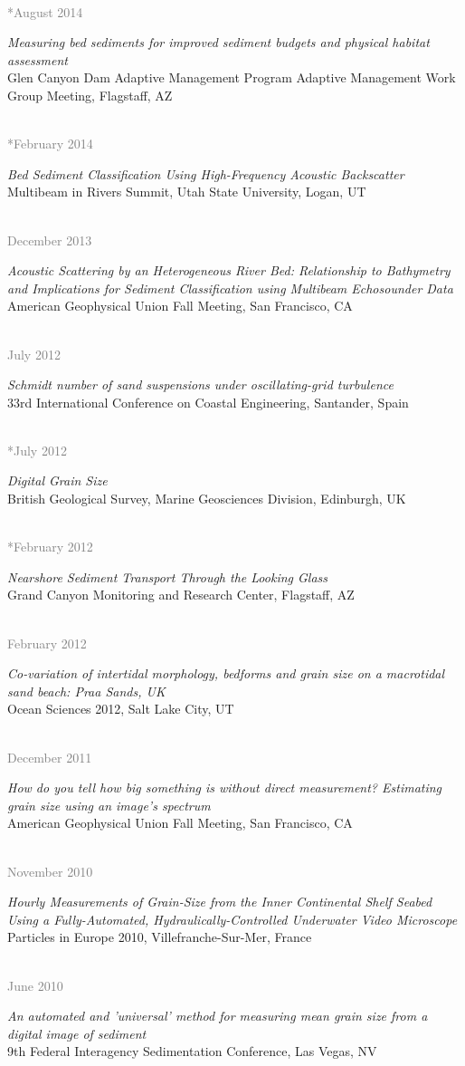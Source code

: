 \documentclass{article} %
\newlength\sidebarwidth
\newcommand{\dateonly}[2][]
	 {\begin{minipage}{\textwidth}
	 \vspace*{.4\baselineskip}
         \nopagebreak\hspace{0in}%
         \nopagebreak\begin{minipage}[t]{\sidebarwidth - .2cm}
         \raggedleft {~}
         {\\[-\baselineskip] \textcolor{gray}{\footnotesize #1}}
	 \end{minipage}%
	 \hfill
	 \begin{minipage}[t]{\linewidth - \sidebarwidth}
	 #2%
	 \end{minipage}%
	 \vspace*{.2\baselineskip plus 1\baselineskip minus
	 .2\baselineskip}%
	 \end{minipage}}
\begin{document}
  \dateonly[**August 2014]{
      {\it Measuring bed sediments for improved sediment budgets and physical habitat assessment}\\
      Glen Canyon Dam Adaptive Management Program Adaptive Management Work Group Meeting, Flagstaff, AZ
  }

  \dateonly[**February 2014]{
      {\it Bed Sediment Classification Using High-Frequency Acoustic Backscatter}\\
      Multibeam in Rivers Summit, Utah State University, Logan, UT
  }

  \dateonly[December 2013]{
      {\it Acoustic Scattering by an Heterogeneous River Bed: Relationship to Bathymetry and Implications for Sediment Classification using Multibeam Echosounder Data}\\
      American Geophysical Union Fall Meeting, San Francisco, CA
  }

  \dateonly[July 2012]{
      {\it Schmidt number of sand suspensions under oscillating-grid turbulence}\\
      33rd International Conference on Coastal Engineering, Santander, Spain
  }

  \dateonly[**July 2012]{
      {\it Digital Grain Size}\\
      British Geological Survey, Marine Geosciences Division, Edinburgh, UK
  }

  \dateonly[**February 2012]{
      {\it Nearshore Sediment Transport Through the Looking Glass}\\
      Grand Canyon Monitoring and Research Center, Flagstaff, AZ
  }

  \dateonly[February 2012]{
      {\it Co-variation of intertidal morphology, bedforms and grain size on a macrotidal sand beach: Praa Sands, UK}\\
      Ocean Sciences 2012, Salt Lake City, UT
  }

  \dateonly[December 2011]{
      {\it How do you tell how big something is without direct measurement? Estimating grain size using an image's spectrum}\\
      American Geophysical Union Fall Meeting, San Francisco, CA
  }

  \dateonly[November 2010]{
      {\it Hourly Measurements of Grain-Size from the Inner Continental Shelf Seabed Using a Fully-Automated, Hydraulically-Controlled Underwater Video Microscope}\\
      Particles in Europe 2010, Villefranche-Sur-Mer, France
  }

  \dateonly[June 2010]{
      {\it An automated and 'universal' method for measuring mean grain size from a digital image of sediment}\\
      9th Federal Interagency Sedimentation Conference, Las Vegas, NV
  }
\end{document}

